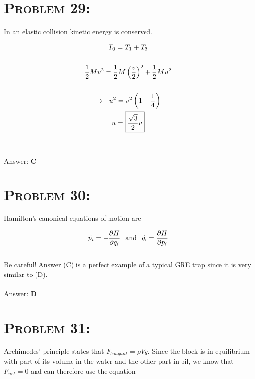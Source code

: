 \documentclass{article}
\begin{document}

\section{\textsc{Problem 29:}} In an elastic collision kinetic energy is conserved.

\begin{gather}
T_{0} = T_{1} +T_{2}\nonumber\\
\nonumber\\
\frac{1}{2}Mv^2 = \frac{1}{2}M\left(\frac{v}{2}\right)^{2} + \frac{1}{2}Mu^{2}\nonumber\\\nonumber\\
\rightarrow \hspace{.1in} u^2 = v^2\left(1-\frac{1}{4}\right)\nonumber\\
u = \boxed{\frac{\sqrt{3}}{2}v}\nonumber
\end{gather}
\\\\
Answer: \textbf{\textcolor{ProcessBlue}C}\\


\section{\textsc{Problem 30:}} Hamilton's canonical equations of motion are

\begin{align}
\dot{p_{i}} = -\frac{\partial H}{\partial q_{i}} \hspace{.1in} \text{and} \hspace{.1in} \dot{q_{i}} = \frac{\partial H}{\partial p_{i}}
\end{align}
\\
Be careful! Answer (C) is a perfect example of a typical GRE trap since it is very similar to (D).
\\\\
Answer: \textbf{\textcolor{ProcessBlue}D}\\


\section{\textsc{Problem 31:}} Archimedes' principle states that $F_{bouyant} = \rho V g$. Since the block is in equilibrium with part of its volume in the water and the other part in oil, we know that $F_{net}= 0$ and can therefore use the equation
\end{document}
